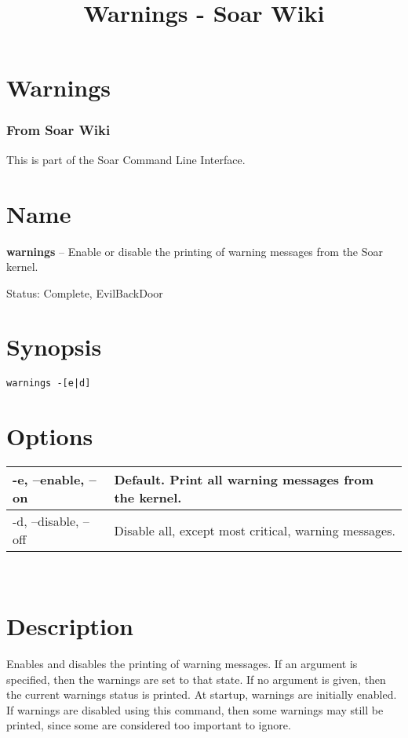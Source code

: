 \documentclass[10pt]{article}
\title{Warnings - Soar Wiki}
\begin{document}
\section*{Warnings}
\subsubsection*{From Soar Wiki}


 This is part of the Soar Command Line Interface. 
\section*{ Name }


 \textbf{warnings}
 -- Enable or disable the printing of warning messages from the Soar kernel. 


 Status: Complete, EvilBackDoor
\section*{ Synopsis }
\begin{verbatim}
warnings -[e|d]

\end{verbatim}
\section*{ Options }


\begin{tabular}{|p{1in}|p{5in}|}
\hline 
 -e, --enable, --on  & Default. Print all warning messages from the kernel.  \\
 \hline 
 -d, --disable, --off  & Disable all, except most critical, warning messages.  \\
 \hline 

\end{tabular}



 \\ 

\section*{ Description }


 Enables and disables the printing of warning messages. If an argument is specified, then the warnings are set to that state. If no argument is given, then the current warnings status is printed. At startup, warnings are initially enabled. If warnings are disabled using this command, then some warnings may still be printed, since some are considered too important to ignore. 
\end{document}
